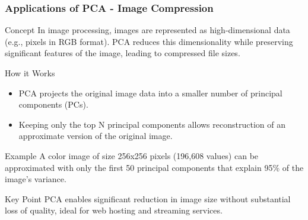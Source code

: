 \documentclass[aspectratio=169]{beamer}
\begin{document}
\begin{frame}[fragile]
    \frametitle{Applications of PCA - Image Compression}
    \begin{block}{Concept}
        In image processing, images are represented as high-dimensional data (e.g., pixels in RGB format). PCA reduces this dimensionality while preserving significant features of the image, leading to compressed file sizes.
    \end{block}
    
    \begin{block}{How it Works}
        \begin{itemize}
            \item PCA projects the original image data into a smaller number of principal components (PCs).
            \item Keeping only the top N principal components allows reconstruction of an approximate version of the original image.
        \end{itemize}
    \end{block}
    
    \begin{block}{Example}
        A color image of size 256x256 pixels (196,608 values) can be approximated with only the first 50 principal components that explain 95\% of the image's variance.
    \end{block}

    \begin{block}{Key Point}
        PCA enables significant reduction in image size without substantial loss of quality, ideal for web hosting and streaming services.
    \end{block}
\end{frame}
\end{document}

